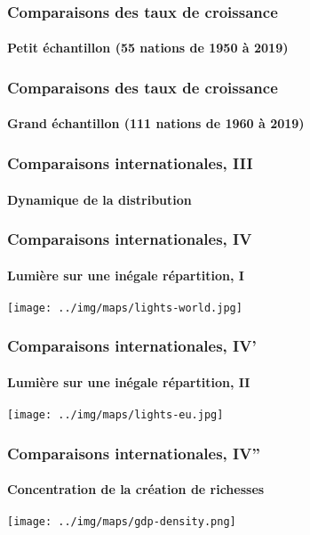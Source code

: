 \documentclass[10pt,notheorems]{beamer}
\theoremstyle{plain}
\theoremstyle{definition} %
\begin{document}
\begin{frame}
  \frametitle{Comparaisons des taux de croissance}
  \framesubtitle{Petit échantillon (55 nations de 1950 à 2019)}

  \begin{Center}
    
  \end{Center}

\end{frame}


\begin{frame}
  \frametitle{Comparaisons des taux de croissance}
  \framesubtitle{Grand échantillon (111 nations de 1960 à 2019)}

  \begin{Center}
    
  \end{Center}

\end{frame}


\begin{frame}
  \frametitle{Comparaisons internationales, III}
  \framesubtitle{Dynamique de la distribution}

  \begin{center}
    
  \end{center}

\end{frame}


\begin{frame}
  \frametitle{Comparaisons internationales, IV}
  \framesubtitle{Lumière sur une inégale répartition, I}

  \begin{center}
    \texttt{[image: ../img/maps/lights-world.jpg]}
  \end{center}

\end{frame}


\begin{frame}
  \frametitle{Comparaisons internationales, IV'}
  \framesubtitle{Lumière sur une inégale répartition, II}

  \begin{center}
    \texttt{[image: ../img/maps/lights-eu.jpg]}
  \end{center}

\end{frame}


\begin{frame}
  \frametitle{Comparaisons internationales, IV''}
  \framesubtitle{Concentration de la création de richesses}

  \begin{center}
    \texttt{[image: ../img/maps/gdp-density.png]}
  \end{center}

\end{frame}
\end{document}
